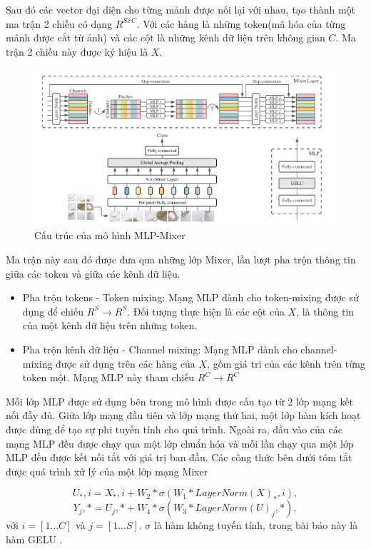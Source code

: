 Sau đó các vector đại diện cho từng mảnh được nối lại với nhau, tạo thành một ma trận 2 chiều có dạng $R^{SxC}$. Với các hàng là những token(mã hóa của từng mảnh được cắt từ ảnh) và các cột là những kênh dữ liệu trên không gian $C$. Ma trận 2 chiều này được ký hiệu là $X$.

\begin{figure}[H]
    \centering
    \includegraphics{pics/Chapter3/mixer.png}
    \caption{Cấu trúc của mô hình MLP-Mixer \cite{tolstikhin2021mlpmixer}}
    \label{fig:enter-label}
\end{figure}

Ma trận này sau đó được đưa qua những lớp Mixer, lần lượt pha trộn thông tin giữa các token và giữa các kênh dữ liệu.
\begin{itemize}
    \item Pha trộn tokens - Token mixing: Mạng MLP dành cho token-mixing được sử dụng để chiếu $R^{S}\rightarrow R^{S}$. Đối tượng thực hiện là các cột của $X$, là thông tin của một kênh dữ liệu trên những token.
    \item Pha trộn kênh dữ liệu - Channel mixing: Mạng MLP dành cho channel-mixing được sử dụng trên các hàng của $X$, gồm giá tri của các kênh trên từng token một. Mạng MLP này tham chiếu $R^{C}\rightarrow R^{C}$
\end{itemize}

Mỗi lớp MLP được sử dụng bên trong mô hình được cấu tạo từ 2 lớp mạng kết nối đầy đủ. Giữa lớp mạng đầu tiên và lớp mạng thứ hai, một lớp hàm kích hoạt được dùng để tạo sự phi tuyến tính cho quá trình. Ngoài ra, đầu vào của các mạng MLP đều được chạy qua một lớp chuẩn hóa và mỗi lần chạy qua một lớp MLP đều được kết nối tắt với giá trị ban đầu. Các công thức bên dưới tóm tắt được quá trình xử lý của một lớp mạng Mixer

\begin{equation}
    U_*,i = X_*,i + W_2*\sigma(W_1*LayerNorm(X)_*,i),
\end{equation}
\begin{equation}
    Y_j,* = U_j,* + W_4*\sigma(W_3*LayerNorm(U)_j,*),
\end{equation}
với $i = [1...C]$ và $j = [1...S]$. $\sigma$ là hàm không tuyến tính, trong bài báo này là hàm GELU \cite{hendrycks2023gaussian}.

